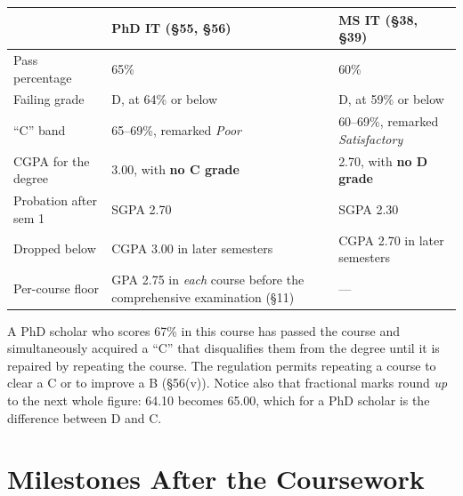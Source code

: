 \begin{center}
\small
\begin{tabular}{@{}L{4.4cm}L{5.3cm}L{5.3cm}@{}}
\toprule
 & \textbf{PhD IT} (\S55, \S56) & \textbf{MS IT} (\S38, \S39) \\
\midrule
Pass percentage      & 65\%  & 60\% \\
Failing grade        & D, at 64\% or below & D, at 59\% or below \\
``C'' band           & 65--69\%, remarked \emph{Poor} & 60--69\%, remarked \emph{Satisfactory} \\
CGPA for the degree  & 3.00, with \textbf{no C grade} & 2.70, with \textbf{no D grade} \\
Probation after sem 1 & SGPA 2.70 & SGPA 2.30 \\
Dropped below        & CGPA 3.00 in later semesters & CGPA 2.70 in later semesters \\
Per-course floor     & GPA 2.75 in \emph{each} course before the comprehensive examination (\S11) & --- \\
\bottomrule
\end{tabular}
\end{center}

\begin{pitfall}
A PhD scholar who scores 67\% in this course has passed the course and
simultaneously acquired a ``C'' that disqualifies them from the degree until
it is repaired by repeating the course. The regulation permits repeating a
course to clear a C or to improve a B (\S56(v)). Notice also that fractional
marks round \emph{up} to the next whole figure: 64.10 becomes 65.00, which for
a PhD scholar is the difference between D and C.
\end{pitfall}

\section{Milestones After the Coursework}

